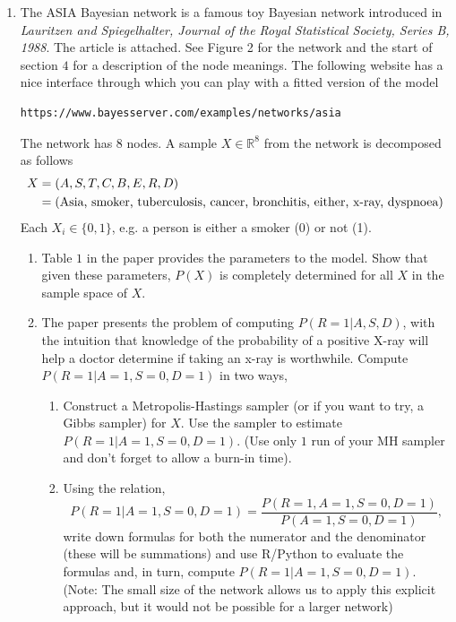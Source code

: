 \documentclass{article}
\begin{document}
\begin{enumerate} 

\item The ASIA Bayesian network is a famous toy Bayesian network introduced in  \textit{Lauritzen and Spiegelhalter, Journal of the Royal Statistical Society, Series B, 1988}.   The article is attached.  See Figure 2 for the network and the start of section $4$ for a description of the node meanings.  The following website has a nice interface through which you can play with a fitted version of the model
\begin{verbatim}
https://www.bayesserver.com/examples/networks/asia
\end{verbatim}
The network has $8$ nodes. A sample $X \in \mathbb{R}^8$ from the network is decomposed as follows
\begin{align}
X &= (A, S, T, C, B, E, R, D) \\ \notag &= \text{(Asia, smoker, tuberculosis, cancer, bronchitis, either, x-ray, dyspnoea)}
\end{align}
Each $X_i \in \{0,1\}$, e.g. a person is either a smoker (0) or not (1).
\begin{enumerate}
\item Table $1$ in the paper provides the parameters to the model.  Show that given these parameters, $P(X)$ is completely determined for all $X$ in the sample space of $X$.
\item The paper presents the problem of computing $P(R=1 | A, S, D)$, with the intuition that knowledge of the probability of a positive X-ray will help a doctor determine if taking an x-ray is worthwhile.  Compute $P(R=1 | A=1, S=0, D=1)$  in two  ways,
\begin{enumerate}
\item Construct a Metropolis-Hastings sampler (or if you want to try, a Gibbs sampler) for $X$.  Use the sampler to estimate $P(R=1 | A=1, S=0, D=1)$.  (Use only $1$ run of your MH sampler and don't forget to allow a burn-in time).
\item Using the relation,
\begin{equation}
P(R=1 | A=1, S=0, D=1) = \frac{P(R=1, A=1, S=0, D=1)}{P(A=1, S=0, D=1)},
\end{equation}  
write down formulas for both the numerator and the denominator (these will be summations) and use R/Python to evaluate the formulas and, in turn, compute $P(R=1 | A=1, S=0, D=1)$.  (Note:  The small size of the network allows us to apply this explicit approach, but it would not be possible for a larger network) 
\end{enumerate}
\end{enumerate}


\end{enumerate}
\end{document}
